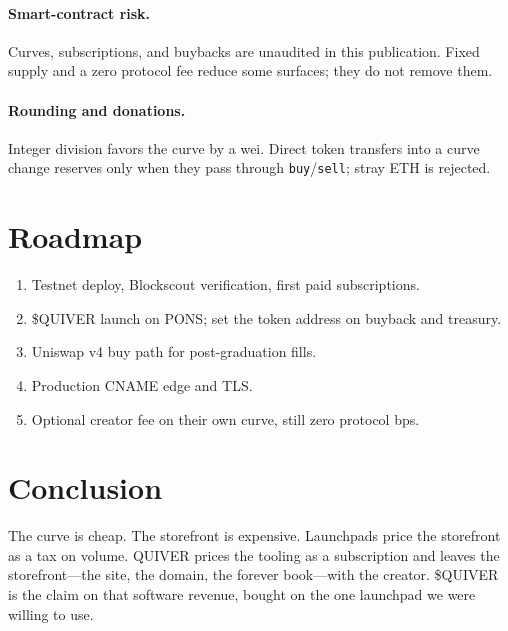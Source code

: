 \documentclass[11pt,a4paper]{article}
\begin{document}
\paragraph{Smart-contract risk.}
Curves, subscriptions, and buybacks are unaudited in this publication. Fixed supply and a zero protocol fee reduce some surfaces; they do not remove them.

\paragraph{Rounding and donations.}
Integer division favors the curve by a wei. Direct token transfers into a curve change reserves only when they pass through \texttt{buy}/\texttt{sell}; stray ETH is rejected.

\section{Roadmap}

\begin{enumerate}[leftmargin=1.4em]
  \item Testnet deploy, Blockscout verification, first paid subscriptions.
  \item \$QUIVER launch on PONS; set the token address on buyback and treasury.
  \item Uniswap v4 buy path for post-graduation fills.
  \item Production CNAME edge and TLS.
  \item Optional creator fee on their own curve, still zero protocol bps.
\end{enumerate}

\section{Conclusion}

The curve is cheap. The storefront is expensive. Launchpads price the storefront as a tax on volume. QUIVER prices the tooling as a subscription and leaves the storefront---the site, the domain, the forever book---with the creator. \$QUIVER is the claim on that software revenue, bought on the one launchpad we were willing to use.
\end{document}
